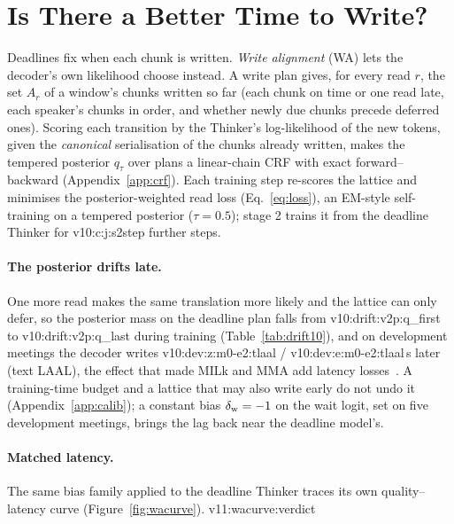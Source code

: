 \section{Is There a Better Time to Write?}
\label{sec:write}
\label{sec:method-latent}

Deadlines fix when each chunk is written. \emph{Write alignment} (WA) lets the decoder's own likelihood choose instead.
A write plan gives, for every read $r$, the set $A_r$ of a window's chunks written so far (each chunk on time or one
read late, each speaker's chunks in order, and whether newly due chunks precede deferred ones). Scoring each transition
by the Thinker's log-likelihood of the new tokens, given the \emph{canonical} serialisation of the chunks already
written, makes the tempered posterior $q_\tau$ over plans a linear-chain CRF with exact forward--backward
(Appendix~\ref{app:crf}). Each training step re-scores the lattice and minimises the posterior-weighted read loss
(Eq.~\eqref{eq:loss}), an EM-style self-training on a tempered posterior ($\tau=0.5$); stage 2 trains it from the
deadline Thinker for \num{v10:c:j:s2step} further steps.

\paragraph{The posterior drifts late.} One more read makes the same translation more likely and the lattice can only
defer, so the posterior mass on the deadline plan falls from \num{v10:drift:v2p:q_first} to
\num{v10:drift:v2p:q_last} during training (Table~\ref{tab:drift10}), and on development meetings the decoder writes
\num{v10:dev:z:m0-e2:tlaal} / \num{v10:dev:e:m0-e2:tlaal}\,s later (text LAAL), the effect that made MILk and MMA add
latency losses~\citep{arivazhagan2019milk,ma2020mma}. A training-time budget and a lattice that may also write early
do not undo it (Appendix~\ref{app:calib}); a constant bias $\delta_{\mathrm{w}}=-1$ on the wait logit, set on five development
meetings, brings the lag back near the deadline model's.
\ifWAcurve

\paragraph{Matched latency.} The same bias family applied to the deadline Thinker traces its own quality--latency
curve (Figure~\ref{fig:wacurve}). \num{v11:wacurve:verdict}
\fi

